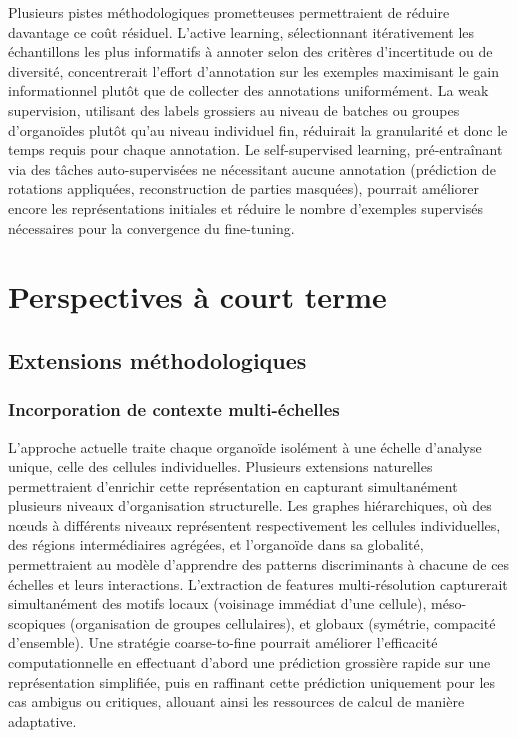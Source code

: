 Plusieurs pistes méthodologiques prometteuses permettraient de réduire davantage ce coût résiduel. L'active learning, sélectionnant itérativement les échantillons les plus informatifs à annoter selon des critères d'incertitude ou de diversité, concentrerait l'effort d'annotation sur les exemples maximisant le gain informationnel plutôt que de collecter des annotations uniformément. La weak supervision, utilisant des labels grossiers au niveau de batches ou groupes d'organoïdes plutôt qu'au niveau individuel fin, réduirait la granularité et donc le temps requis pour chaque annotation. Le self-supervised learning, pré-entraînant via des tâches auto-supervisées ne nécessitant aucune annotation (prédiction de rotations appliquées, reconstruction de parties masquées), pourrait améliorer encore les représentations initiales et réduire le nombre d'exemples supervisés nécessaires pour la convergence du fine-tuning.

\section{Perspectives à court terme}

\subsection{Extensions méthodologiques}

\subsubsection{Incorporation de contexte multi-échelles}

L'approche actuelle traite chaque organoïde isolément à une échelle d'analyse unique, celle des cellules individuelles. Plusieurs extensions naturelles permettraient d'enrichir cette représentation en capturant simultanément plusieurs niveaux d'organisation structurelle. Les graphes hiérarchiques, où des nœuds à différents niveaux représentent respectivement les cellules individuelles, des régions intermédiaires agrégées, et l'organoïde dans sa globalité, permettraient au modèle d'apprendre des patterns discriminants à chacune de ces échelles et leurs interactions. L'extraction de features multi-résolution capturerait simultanément des motifs locaux (voisinage immédiat d'une cellule), méso-scopiques (organisation de groupes cellulaires), et globaux (symétrie, compacité d'ensemble). Une stratégie coarse-to-fine pourrait améliorer l'efficacité computationnelle en effectuant d'abord une prédiction grossière rapide sur une représentation simplifiée, puis en raffinant cette prédiction uniquement pour les cas ambigus ou critiques, allouant ainsi les ressources de calcul de manière adaptative.

